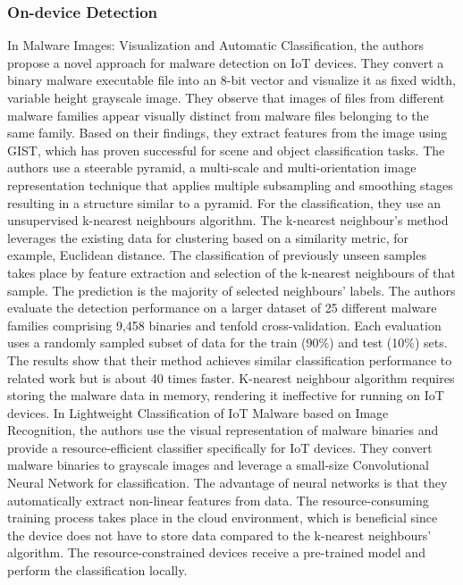 \documentclass[conference, 11pt]{IEEEtran}
\begin{document}
\subsubsection{On-device Detection}
In Malware Images: Visualization and Automatic Classification, the authors propose a novel approach for malware detection on IoT devices.
They convert a binary malware executable file into an 8-bit vector and visualize it as fixed width, variable height grayscale image.
They observe that images of files from different malware families appear visually distinct from malware files belonging to the same family.
Based on their findings, they extract features from the image using GIST, which has proven successful for scene and object classification tasks.
The authors use a steerable pyramid, a multi-scale and multi-orientation image representation technique that applies multiple subsampling and smoothing stages resulting in a structure similar to a pyramid.
For the classification, they use an unsupervised k-nearest neighbours algorithm.
The k-nearest neighbour's method leverages the existing data for clustering based on a similarity metric, for example, Euclidean distance.
The classification of previously unseen samples takes place by feature extraction and selection of the k-nearest neighbours of that sample.
The prediction is the majority of selected neighbours' labels.
The authors evaluate the detection performance on a larger dataset of 25 different malware families comprising 9,458 binaries and tenfold cross-validation.
Each evaluation uses a randomly sampled subset of data for the train (90\%) and test (10\%) sets.
The results show that their method achieves similar classification performance to related work but is about 40 times faster.
K-nearest neighbour algorithm requires storing the malware data in memory, rendering it ineffective for running on IoT devices.
In Lightweight Classification of IoT Malware based on Image Recognition, the authors use the visual representation of malware binaries and provide a resource-efficient classifier specifically for IoT devices.
They convert malware binaries to grayscale images and leverage a small-size Convolutional Neural Network for classification.
The advantage of neural networks is that they automatically extract non-linear features from data.
The resource-consuming training process takes place in the cloud environment, which is beneficial since the device does not have to store data compared to the k-nearest neighbours' algorithm.
The resource-constrained devices receive a pre-trained model and perform the classification locally.
\end{document}
